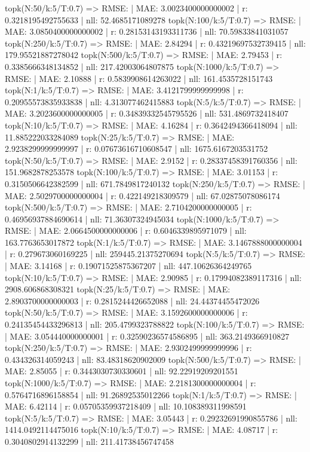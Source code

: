 topk(N:50/k:5/T:0.7) => RMSE: | MAE: 3.0023400000000002 | r: 0.3218195492755633 | nll: 52.4685171089278
topk(N:100/k:5/T:0.7) => RMSE: | MAE: 3.0850400000000002 | r: 0.28153143193311736 | nll: 70.59833841031057
topk(N:250/k:5/T:0.7) => RMSE: | MAE: 2.84294 | r: 0.43219697532739415 | nll: 179.95521887278042
topk(N:500/k:5/T:0.7) => RMSE: | MAE: 2.79453 | r: 0.3385666348134852 | nll: 217.42003064807875
topk(N:1000/k:5/T:0.7) => RMSE: | MAE: 2.10888 | r: 0.5839908614263022 | nll: 161.4535728151743
topk(N:1/k:5/T:0.7) => RMSE: | MAE: 3.4121799999999998 | r: 0.20955573835933838 | nll: 4.313077462415883
topk(N:5/k:5/T:0.7) => RMSE: | MAE: 3.2023600000000005 | r: 0.34839332545795526 | nll: 531.4869732418407
topk(N:10/k:5/T:0.7) => RMSE: | MAE: 4.16284 | r: 0.3642494366418094 | nll: 11.885222033284089
topk(N:25/k:5/T:0.7) => RMSE: | MAE: 2.9238299999999997 | r: 0.07673616710608547 | nll: 1675.6167203531752
topk(N:50/k:5/T:0.7) => RMSE: | MAE: 2.9152 | r: 0.28337458391760356 | nll: 151.9682878253578
topk(N:100/k:5/T:0.7) => RMSE: | MAE: 3.01153 | r: 0.3150506642382599 | nll: 671.7849817240132
topk(N:250/k:5/T:0.7) => RMSE: | MAE: 2.5029700000000004 | r: 0.422149218309579 | nll: 67.02875078086174
topk(N:500/k:5/T:0.7) => RMSE: | MAE: 2.7104200000000005 | r: 0.46956937884690614 | nll: 71.36307324945034
topk(N:1000/k:5/T:0.7) => RMSE: | MAE: 2.0664500000000006 | r: 0.6046339895971079 | nll: 163.7763653017872
topk(N:1/k:5/T:0.7) => RMSE: | MAE: 3.1467888000000004 | r: 0.279673060169225 | nll: 259445.21375270694
topk(N:5/k:5/T:0.7) => RMSE: | MAE: 3.14168 | r: 0.19071525875367207 | nll: 447.10626364249765
topk(N:10/k:5/T:0.7) => RMSE: | MAE: 2.90985 | r: 0.17994082389117316 | nll: 2908.606868308321
topk(N:25/k:5/T:0.7) => RMSE: | MAE: 2.8903700000000003 | r: 0.2815244426652088 | nll: 24.44374455472026
topk(N:50/k:5/T:0.7) => RMSE: | MAE: 3.1592600000000006 | r: 0.24135454433296813 | nll: 205.4799323788822
topk(N:100/k:5/T:0.7) => RMSE: | MAE: 3.054440000000001 | r: 0.32590236574586895 | nll: 363.2149366910827
topk(N:250/k:5/T:0.7) => RMSE: | MAE: 2.9302499999999996 | r: 0.434326314059243 | nll: 83.48318620902009
topk(N:500/k:5/T:0.7) => RMSE: | MAE: 2.85055 | r: 0.3443030730330601 | nll: 92.22919209201551
topk(N:1000/k:5/T:0.7) => RMSE: | MAE: 2.2181300000000004 | r: 0.5764716896158854 | nll: 91.26892535012266
topk(N:1/k:5/T:0.7) => RMSE: | MAE: 6.42114 | r: 0.05705359937218409 | nll: 10.108389311998591
topk(N:5/k:5/T:0.7) => RMSE: | MAE: 3.05443 | r: 0.29232691990855786 | nll: 1414.0492114475016
topk(N:10/k:5/T:0.7) => RMSE: | MAE: 4.08717 | r: 0.3040802914132299 | nll: 211.41738456747458
